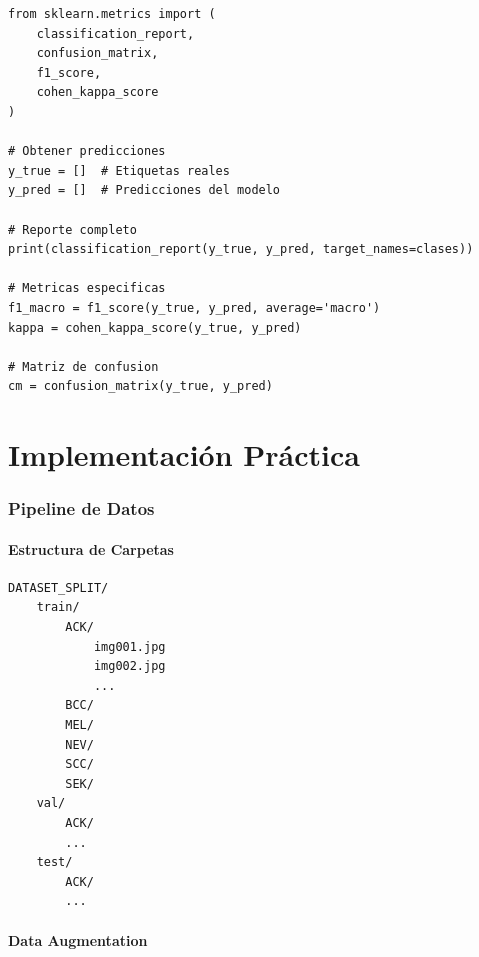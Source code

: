 \documentclass[12pt,a4paper]{article}
\begin{document}
\begin{lstlisting}[caption={Cálculo de métricas en Python}]
from sklearn.metrics import (
    classification_report,
    confusion_matrix,
    f1_score,
    cohen_kappa_score
)

# Obtener predicciones
y_true = []  # Etiquetas reales
y_pred = []  # Predicciones del modelo

# Reporte completo
print(classification_report(y_true, y_pred, target_names=clases))

# Metricas especificas
f1_macro = f1_score(y_true, y_pred, average='macro')
kappa = cohen_kappa_score(y_true, y_pred)

# Matriz de confusion
cm = confusion_matrix(y_true, y_pred)
\end{lstlisting}

\newpage
\part{Implementación Práctica}

\section{Pipeline de Datos}

\subsection{Estructura de Carpetas}

\begin{lstlisting}[language=bash, caption={Estructura del dataset}]
DATASET_SPLIT/
    train/
        ACK/
            img001.jpg
            img002.jpg
            ...
        BCC/
        MEL/
        NEV/
        SCC/
        SEK/
    val/
        ACK/
        ...
    test/
        ACK/
        ...
\end{lstlisting}

\subsection{Data Augmentation}
\end{document}
